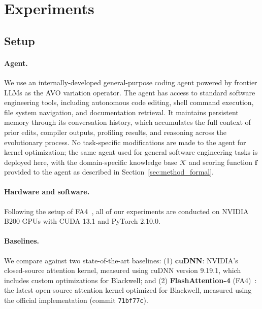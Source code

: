 \section{Experiments}
\label{sec:experiments}

\subsection{Setup}
\label{sec:setup}

\paragraph{Agent.}
We use an internally-developed general-purpose coding agent powered by frontier LLMs as the AVO variation operator.
The agent has access to standard software engineering tools, including autonomous code editing, shell command execution, file system navigation, and documentation retrieval.
It maintains persistent memory through its conversation history, which accumulates the full context of prior edits, compiler outputs, profiling results, and reasoning across the evolutionary process.
No task-specific modifications are made to the agent for kernel optimization; the same agent used for general software engineering tasks is deployed here, with the domain-specific knowledge base $\mathcal{K}$ and scoring function $\mathbf{f}$ provided to the agent as described in Section~\ref{sec:method_formal}.

\paragraph{Hardware and software.}
Following the setup of FA4~\citep{zadouri2026flashattention4}, all of our experiments are conducted on NVIDIA B200 GPUs with CUDA 13.1 and PyTorch 2.10.0.

\paragraph{Baselines.}
We compare against two state-of-the-art baselines:
(1) \textbf{cuDNN}: NVIDIA's closed-source attention kernel, measured using cuDNN version 9.19.1, which includes custom optimizations for Blackwell; and
(2) \textbf{FlashAttention-4} (FA4)~\citep{zadouri2026flashattention4}: the latest open-source attention kernel optimized for Blackwell, measured using the official implementation (commit \texttt{71bf77c}).


